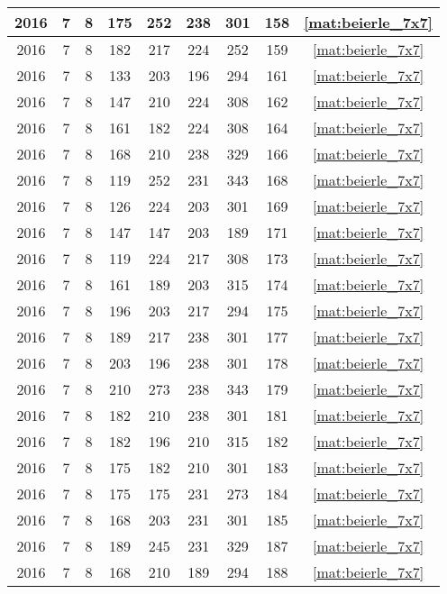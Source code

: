 \begin{longtable}{|c|c|c|c|c|c|c|c|c|}
2016 & 7 & 8 & 175 & 252 & 238 & 301 & 158 & \eqref{mat:beierle_7x7} \\ \hline 
2016 & 7 & 8 & 182 & 217 & 224 & 252 & 159 & \eqref{mat:beierle_7x7} \\ \hline 
2016 & 7 & 8 & 133 & 203 & 196 & 294 & 161 & \eqref{mat:beierle_7x7} \\ \hline 
2016 & 7 & 8 & 147 & 210 & 224 & 308 & 162 & \eqref{mat:beierle_7x7} \\ \hline 
2016 & 7 & 8 & 161 & 182 & 224 & 308 & 164 & \eqref{mat:beierle_7x7} \\ \hline 
2016 & 7 & 8 & 168 & 210 & 238 & 329 & 166 & \eqref{mat:beierle_7x7} \\ \hline 
2016 & 7 & 8 & 119 & 252 & 231 & 343 & 168 & \eqref{mat:beierle_7x7} \\ \hline 
2016 & 7 & 8 & 126 & 224 & 203 & 301 & 169 & \eqref{mat:beierle_7x7} \\ \hline 
2016 & 7 & 8 & 147 & 147 & 203 & 189 & 171 & \eqref{mat:beierle_7x7} \\ \hline 
2016 & 7 & 8 & 119 & 224 & 217 & 308 & 173 & \eqref{mat:beierle_7x7} \\ \hline 
2016 & 7 & 8 & 161 & 189 & 203 & 315 & 174 & \eqref{mat:beierle_7x7} \\ \hline 
2016 & 7 & 8 & 196 & 203 & 217 & 294 & 175 & \eqref{mat:beierle_7x7} \\ \hline 
2016 & 7 & 8 & 189 & 217 & 238 & 301 & 177 & \eqref{mat:beierle_7x7} \\ \hline 
2016 & 7 & 8 & 203 & 196 & 238 & 301 & 178 & \eqref{mat:beierle_7x7} \\ \hline 
2016 & 7 & 8 & 210 & 273 & 238 & 343 & 179 & \eqref{mat:beierle_7x7} \\ \hline 
2016 & 7 & 8 & 182 & 210 & 238 & 301 & 181 & \eqref{mat:beierle_7x7} \\ \hline 
2016 & 7 & 8 & 182 & 196 & 210 & 315 & 182 & \eqref{mat:beierle_7x7} \\ \hline 
2016 & 7 & 8 & 175 & 182 & 210 & 301 & 183 & \eqref{mat:beierle_7x7} \\ \hline 
2016 & 7 & 8 & 175 & 175 & 231 & 273 & 184 & \eqref{mat:beierle_7x7} \\ \hline 
2016 & 7 & 8 & 168 & 203 & 231 & 301 & 185 & \eqref{mat:beierle_7x7} \\ \hline 
2016 & 7 & 8 & 189 & 245 & 231 & 329 & 187 & \eqref{mat:beierle_7x7} \\ \hline 
2016 & 7 & 8 & 168 & 210 & 189 & 294 & 188 & \eqref{mat:beierle_7x7} \\ \hline 

\end{longtable}
